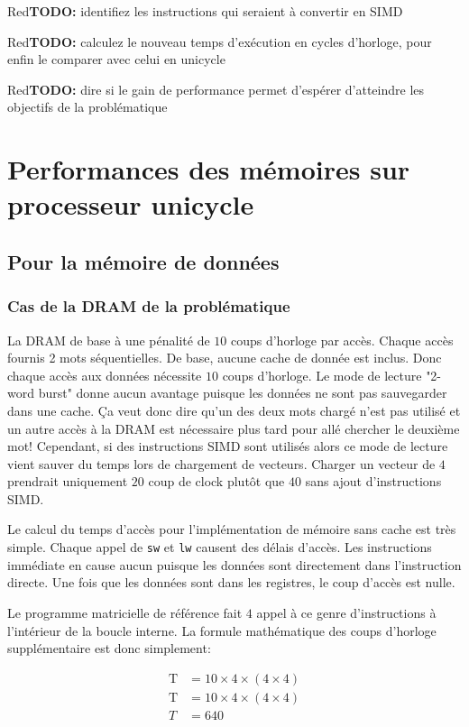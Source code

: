 \documentclass[a11paper]{article}
\newcommand{\todo}[1]{\begin{color}{Red}\textbf{TODO:} #1\end{color}}
\begin{document}
\todo{identifiez les instructions qui seraient à convertir en SIMD}

\todo{calculez le nouveau temps d'exécution en cycles d'horloge, pour enfin le
comparer avec celui en unicycle}

\todo{dire si le gain de performance permet d'espérer d'atteindre les objectifs
de la problématique}



\section{Performances des mémoires sur processeur unicycle}
\subsection{Pour la mémoire de données}
\subsubsection{Cas de la DRAM de la problématique}

La DRAM de base à une pénalité de $10$ coups d'horloge par accès. Chaque accès
fournis 2 mots séquentielles. De base, aucune cache de donnée est inclus.
Donc chaque accès aux données nécessite $10$ coups d'horloge. Le mode de
lecture "2-word burst" donne aucun avantage puisque les données ne sont pas
sauvegarder dans une cache. Ça veut donc dire qu'un des deux mots chargé
n'est pas utilisé et un autre accès à la DRAM est nécessaire plus tard pour
allé chercher le deuxième mot! Cependant, si des instructions SIMD sont
utilisés alors ce mode de lecture vient sauver du temps lors de chargement de
vecteurs. Charger un vecteur de $4$ prendrait uniquement $20$ coup de clock
plutôt que $40$ sans ajout d'instructions SIMD.

Le calcul du temps d'accès pour l'implémentation de mémoire sans cache est très
simple. Chaque appel de \verb|sw| et \verb|lw| causent des délais d'accès.
Les instructions immédiate en cause aucun puisque les données sont directement
dans l'instruction directe. Une fois que les données sont dans les registres,
le coup d'accès est nulle.

Le programme matricielle de référence fait $4$ appel à ce genre
d'instructions à l'intérieur de la boucle interne. La formule mathématique
des coups d'horloge supplémentaire est donc simplement:

\begin{align}
  \text{T} &= 10\times4\times(4\times4) \\
  \text{T} &= 10\times4\times(4\times4) \\
  T        &= 640
\end{align}
\end{document}
